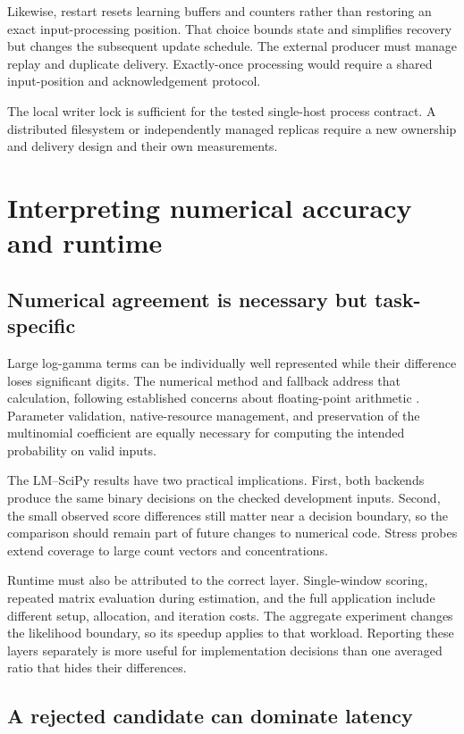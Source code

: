 Likewise, restart resets learning buffers and counters rather than
restoring an exact input-processing position. That choice bounds
state and simplifies recovery but changes the subsequent update
schedule. The external producer must manage replay and duplicate
delivery. Exactly-once processing would require a shared input-position and
acknowledgement protocol.

The local writer lock is sufficient for the tested single-host
process contract. A distributed filesystem or independently managed
replicas require a new ownership and delivery design and their own
measurements.

\section{Interpreting numerical accuracy and runtime}
\label{sec:numerical-discussion}

\subsection{Numerical agreement is necessary but task-specific}

Large log-gamma terms can be individually well represented while
their difference loses significant digits. The numerical method and
fallback address that calculation, following established concerns
about floating-point arithmetic \cite{goldberg1991}. Parameter
validation, native-resource management, and preservation of the
multinomial coefficient are equally necessary for computing the intended
probability on valid inputs.

The LM--SciPy results have two practical implications. First, both backends
produce the same binary decisions on the checked development inputs.
Second, the small observed score differences still matter near a
decision boundary, so the comparison should remain part of future
changes to numerical code. Stress probes extend coverage to large count
vectors and concentrations.

Runtime must also be attributed to the correct layer. Single-window
scoring, repeated matrix evaluation during estimation, and the full
application include different setup, allocation, and iteration costs.
The aggregate experiment changes the likelihood boundary, so its speedup
applies to that workload. Reporting these
layers separately is more useful for implementation decisions than
one averaged ratio that hides their differences.

\subsection{A rejected candidate can dominate latency}

